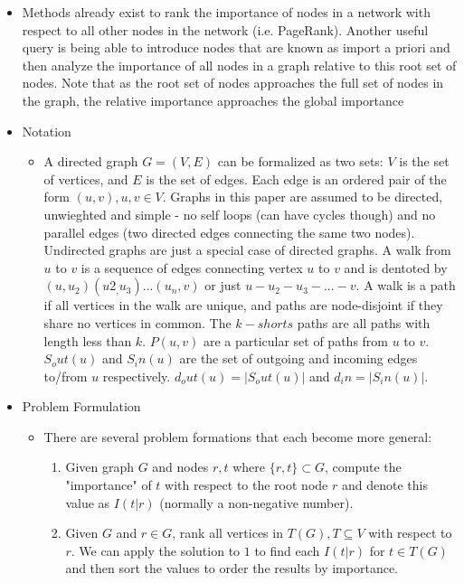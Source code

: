\documentclass[a4paper]{article}
\begin{document}
\begin{itemize}
\item Methods already exist to rank the importance of nodes in a network with respect to all other nodes in the network (i.e. PageRank). Another useful query is being able to introduce nodes that are known as import a priori and then analyze the importance of all nodes in a graph relative to this root set of nodes. Note that as the root set of nodes approaches the full set of nodes in the graph, the relative importance approaches the global importance

\item Notation 
\begin{itemize}
\item A directed graph $G=(V, E)$ can be formalized as two sets: $V$ is the set of vertices, and $E$ is the set of edges. Each edge is an ordered pair of the form $(u, v), u,v \in V$. Graphs in this paper are assumed to be directed, unwieghted and simple - no self loops (can have cycles though) and no parallel edges (two directed edges connecting the same two nodes). Undirected graphs are just a special case of directed graphs. A walk from $u$ to $v$ is a sequence of edges connecting vertex $u$ to $v$ and is dentoted by $(u, u_2)(u2_, u_3)...(u_n, v)$ or just $u - u_2 - u_3 -...-v$. A walk is a path if all vertices in the walk are unique, and paths are node-disjoint if they share no vertices in common. The $k-shorts$ paths are all paths with length less than $k$. $P(u,v)$ are a particular set of paths from $u$ to $v$. $S_out(u)$ and $S_in(u)$ are the set of outgoing and incoming edges to/from $u$ respectively. $d_out(u) = |S_out(u)|$ and $d_in = |S_in(u)|$.
\end{itemize}

\item Problem Formulation
\begin{itemize}
\item There are several problem formations that each become more general:
\begin{enumerate}
\item Given graph $G$ and nodes $r, t$ where $\{r, t\} \subset G$, compute the "importance" of $t$ with respect to the root node $r$ and denote this value as $I(t|r)$ (normally a non-negative number).

\item Given $G$ and $r \in G$, rank all vertices in $T(G), T \subseteq V$ with respect to $r$. We can apply the solution to $1$ to find each $I(t|r)$ for $t \in T(G)$ and then sort the values to order the results by importance.


\end{enumerate}
\end{itemize}
\end{itemize}
\end{document}
